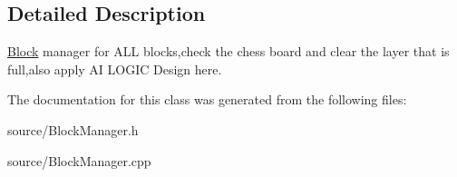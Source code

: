 \subsection{Detailed Description}
\hyperlink{class_block}{Block} manager for A\-L\-L blocks,check the chess board and clear the layer that is full,also apply A\-I L\-O\-G\-I\-C Design here. 

The documentation for this class was generated from the following files\-:\begin{DoxyCompactItemize}
\item 
source/Block\-Manager.\-h\item 
source/Block\-Manager.\-cpp\end{DoxyCompactItemize}
